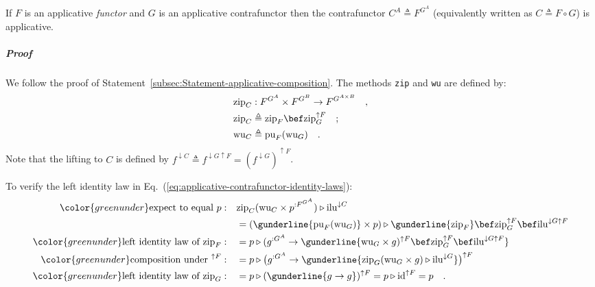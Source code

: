 If $F$ is an applicative \emph{functor} and $G$ is an applicative
contrafunctor then the contrafunctor $C^{A}\triangleq F^{G^{A}}$
(equivalently written as $C\triangleq F\circ G$) is applicative.

\subparagraph{Proof}

We follow the proof of Statement~\ref{subsec:Statement-applicative-composition}.
The methods \lstinline!zip! and \lstinline!wu! are defined by:
\begin{align*}
 & \text{zip}_{C}:F^{G^{A}}\times F^{G^{B}}\rightarrow F^{G^{A\times B}}\quad,\\
 & \text{zip}_{C}\triangleq\text{zip}_{F}\bef\text{zip}_{G}^{\uparrow F}\quad;\\
 & \text{wu}_{C}\triangleq\text{pu}_{F}(\text{wu}_{G})\quad.
\end{align*}
Note that the lifting to $C$ is defined by $f^{\downarrow C}\triangleq f^{\downarrow G\uparrow F}=(f^{\downarrow G})^{\uparrow F}$. 

To verify the left identity law in Eq.~(\ref{eq:applicative-contrafunctor-identity-laws}):
\begin{align*}
{\color{greenunder}\text{expect to equal }p:}\quad & \text{zip}_{C}(\text{wu}_{C}\times p^{:F^{G^{A}}})\triangleright\text{ilu}^{\downarrow C}\\
 & =(\gunderline{\text{pu}_{F}(\text{wu}_{G})}\times p)\triangleright\gunderline{\text{zip}_{F}}\bef\text{zip}_{G}^{\uparrow F}\bef\text{ilu}^{\downarrow G\uparrow F}\\
{\color{greenunder}\text{left identity law of }\text{zip}_{F}:}\quad & =p\triangleright(g^{:G^{A}}\rightarrow\gunderline{\text{wu}_{G}\times g)^{\uparrow F}\bef\text{zip}_{G}^{\uparrow F}\bef\text{ilu}^{\downarrow G\uparrow F}}\\
{\color{greenunder}\text{composition under }^{\uparrow F}:}\quad & =p\triangleright\big(g^{:G^{A}}\rightarrow\gunderline{\text{zip}_{G}(\text{wu}_{G}\times g)\triangleright\text{ilu}^{\downarrow G}}\big)^{\uparrow F}\\
{\color{greenunder}\text{left identity law of }\text{zip}_{G}:}\quad & =p\triangleright(\gunderline{g\rightarrow g})^{\uparrow F}=p\triangleright\text{id}^{\uparrow F}=p\quad.
\end{align*}

